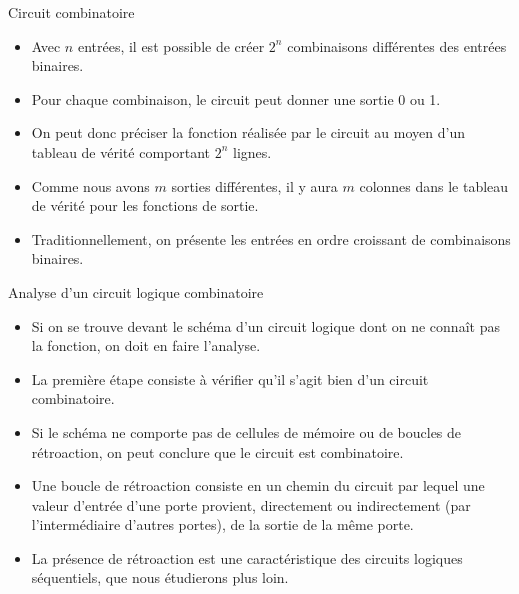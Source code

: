 \documentclass[presentation]{beamer}
\begin{document}
\begin{frame}[label={sec:org7d00cb2}]{Circuit combinatoire}
\begin{itemize}
\item Avec \(n\) entrées, il est possible de créer \(2^n\) combinaisons différentes des entrées binaires.

\item Pour chaque combinaison, le circuit peut donner une sortie 0 ou 1.

\item On peut donc préciser la fonction réalisée par le circuit au moyen d'un tableau de vérité comportant \(2^n\) lignes.

\item Comme nous avons \(m\) sorties différentes, il y aura \(m\) colonnes dans le tableau de vérité pour les fonctions de sortie.

\item Traditionnellement, on présente les entrées en ordre croissant de combinaisons binaires.
\end{itemize}
\end{frame}

\begin{frame}[label={sec:org67c02b8}]{Analyse d'un circuit logique combinatoire}
\begin{itemize}
\item Si on se trouve devant le schéma d'un circuit logique dont on ne connaît pas la fonction, on doit en faire l'analyse.

\item La première étape consiste à vérifier qu'il s'agit bien d'un circuit combinatoire.

\item Si le schéma ne comporte pas de cellules de mémoire ou de boucles de rétroaction, on peut conclure que le circuit est combinatoire.

\item Une boucle de rétroaction consiste en un chemin du circuit par lequel une valeur d'entrée d'une porte provient, directement ou indirectement (par l'intermédiaire d'autres portes), de la sortie de la même porte.

\item La présence de rétroaction est une caractéristique des circuits logiques séquentiels, que nous étudierons plus loin.
\end{itemize}
\end{frame}
\end{document}
